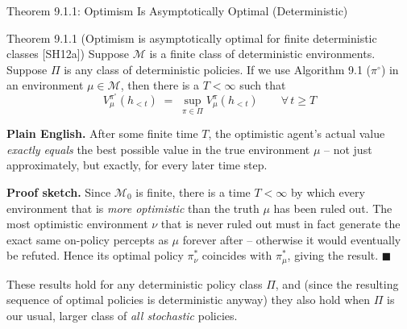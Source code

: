 \documentclass[aspectratio=169,10pt]{beamer}
\begin{document}
\begin{frame}{Theorem 9.1.1: Optimism Is Asymptotically Optimal (Deterministic)}
  \begin{block}{Theorem 9.1.1 (Optimism is asymptotically optimal for finite deterministic classes [SH12a])}
    Suppose $\mathcal{M}$ is a finite class of deterministic environments.
    Suppose $\Pi$ is any class of deterministic policies. If we use
    Algorithm 9.1 ($\pi^\circ$) in an environment $\mu\in\mathcal{M}$, then
    there is a $T<\infty$ such that
    \[
      V^{\pi^\circ}_\mu(h_{<t}) \;=\; \sup_{\pi\in\Pi} V^\pi_\mu(h_{<t}) \qquad \forall\, t\ge T
    \]
  \end{block}
  \textbf{Plain English.} After some finite time $T$, the optimistic agent's
  actual value \emph{exactly equals} the best possible value in the true
  environment $\mu$ -- not just approximately, but exactly, for every later
  time step.

  \vspace{0.3em}
  \textbf{Proof sketch.} Since $\mathcal{M}_0$ is finite, there is a time
  $T<\infty$ by which every environment that is \emph{more optimistic} than
  the truth $\mu$ has been ruled out. The most optimistic environment
  $\nu$ that is never ruled out must in fact generate the exact same
  on-policy percepts as $\mu$ forever after -- otherwise it would eventually
  be refuted. Hence its optimal policy $\pi^*_\nu$ coincides with $\pi^*_\mu$,
  giving the result. $\blacksquare$

  \vspace{0.3em}
  These results hold for any deterministic policy class $\Pi$, and (since
  the resulting sequence of optimal policies is deterministic anyway) they
  also hold when $\Pi$ is our usual, larger class of \emph{all stochastic}
  policies.
\end{frame}
\end{document}
